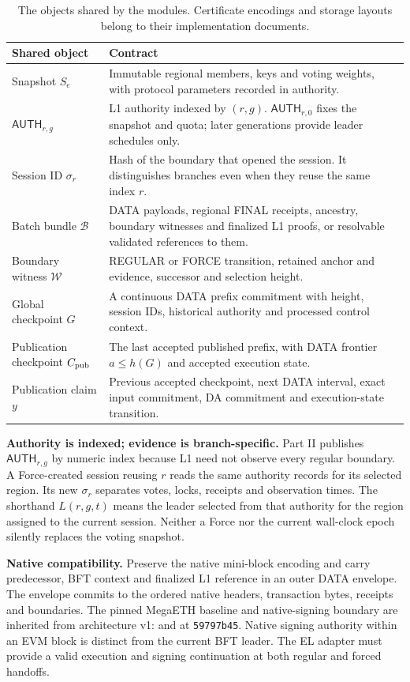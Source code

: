 \documentclass[11pt,a4paper]{article}
\newcommand{\api}[1]{\ensuremath{\mathsf{#1}}}
\newcommand{\src}[2]{\href{#1}{\texttt{\detokenize{#2}}}}
\begin{document}
\begin{table}[H]\centering\small
\begin{tabularx}{\linewidth}{@{}p{.25\linewidth}Y@{}}
\toprule Shared object & Contract\\\midrule
Snapshot $S_e$ & Immutable regional members, keys and voting weights,
with protocol parameters recorded in authority.\\
$\api{AUTH}_{r,g}$ & L1 authority indexed by $(r,g)$.
$\api{AUTH}_{r,0}$ fixes the snapshot and quota; later generations
provide leader schedules only.\\
Session ID $\sigma_r$ & Hash of the boundary that opened the session.
It distinguishes branches even when they reuse the same index $r$.\\
Batch bundle $\mathcal B$ & DATA payloads, regional FINAL receipts,
ancestry, boundary witnesses and finalized L1 proofs, or resolvable
validated references to them.\\
Boundary witness $\mathcal W$ & REGULAR or FORCE transition, retained
anchor and evidence, successor and selection height.\\
Global checkpoint $G$ & A continuous DATA prefix commitment with height,
session IDs, historical authority and processed control context.\\
Publication checkpoint $C_{\rm pub}$ & The last accepted published prefix,
with DATA frontier $a\le h(G)$ and accepted execution state.\\
Publication claim $y$ & Previous accepted checkpoint, next DATA interval,
exact input commitment, DA commitment and execution-state transition.\\\bottomrule
\end{tabularx}
\caption{The objects shared by the modules. Certificate encodings and
storage layouts belong to their implementation documents.}
\end{table}

\textbf{Authority is indexed; evidence is branch-specific.}
Part II publishes $\api{AUTH}_{r,g}$ by numeric index because L1 need not
observe every regular boundary. A Force-created session reusing $r$
reads the same authority records for its selected region. Its new
$\sigma_r$ separates votes, locks, receipts and observation times.
The shorthand $L(r,g,t)$ means the leader selected from that authority
for the region assigned to the current session. Neither a Force nor
the current wall-clock epoch silently replaces the voting snapshot.

\textbf{Native compatibility.} Preserve the native mini-block encoding
and carry predecessor, BFT context and finalized L1 reference in an outer
DATA envelope. The envelope commits to the ordered native headers,
transaction bytes, receipts and boundaries. The pinned MegaETH baseline
and native-signing boundary are inherited from architecture v1:
\src{../megaeth_specs/specs/protocol/blocks.md}{blocks.md} and
\src{../megaeth_specs/specs/protocol/state-sync.md}{state-sync.md}
at \texttt{59797b45}. Native signing authority within an EVM block is
distinct from the current BFT leader. The EL adapter must provide a valid
execution and signing continuation at both regular and forced handoffs.
\end{document}
